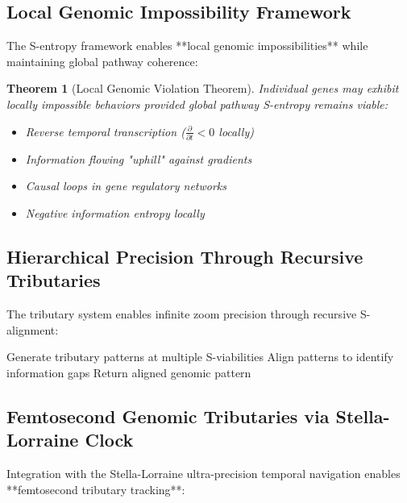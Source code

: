 \documentclass[12pt,a4paper]{article}
\newtheorem{theorem}{Theorem}[section]
\begin{document}
\subsection{Local Genomic Impossibility Framework}

The S-entropy framework enables **local genomic impossibilities** while maintaining global pathway coherence:

\begin{theorem}[Local Genomic Violation Theorem]
Individual genes may exhibit locally impossible behaviors provided global pathway S-entropy remains viable:
\begin{itemize}
\item Reverse temporal transcription ($\frac{\partial}{\partial t} < 0$ locally)
\item Information flowing "uphill" against gradients
\item Causal loops in gene regulatory networks
\item Negative information entropy locally
\end{itemize}
\end{theorem}

\subsection{Hierarchical Precision Through Recursive Tributaries}

The tributary system enables infinite zoom precision through recursive S-alignment:

\begin{algorithm}
\caption{Hierarchical Genomic Tributary Analysis}
\begin{algorithmic}
    \State Generate tributary patterns at multiple S-viabilities
    \State Align patterns to identify information gaps
            \State {}
        \EndFor
    \EndIf
    \State Return aligned genomic pattern
\EndProcedure
\end{algorithmic}
\end{algorithm}

\subsection{Femtosecond Genomic Tributaries via Stella-Lorraine Clock}

Integration with the Stella-Lorraine ultra-precision temporal navigation enables **femtosecond tributary tracking**:
\end{document}
